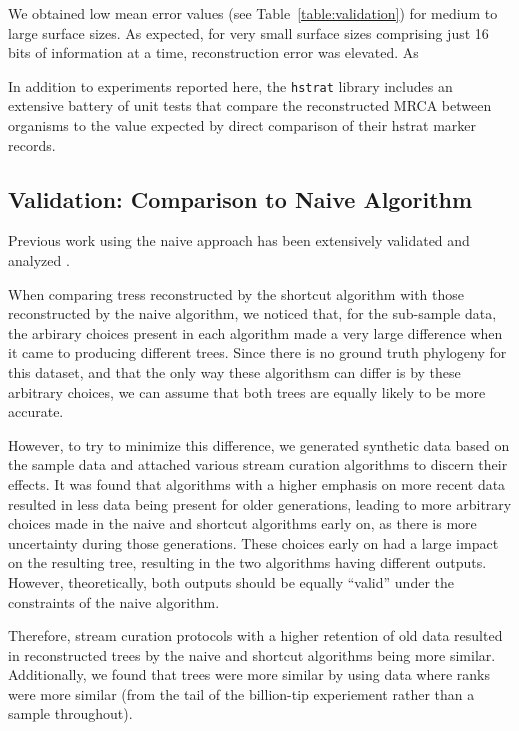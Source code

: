 

We obtained low mean error values (see Table~\ref{table:validation}) for medium to large surface sizes.
As expected, for very small surface sizes comprising just 16 bits of information at a time, reconstruction error was elevated.
As 

In addition to experiments reported here, the \texttt{hstrat} library includes an extensive battery of unit tests that compare the reconstructed MRCA between organisms to the value expected by direct comparison of their hstrat marker records.

\subsection{Validation: Comparison to Naive Algorithm}

Previous work using the naive approach has been extensively validated and analyzed \citep{moreno2025testing}.

When comparing tress reconstructed by the shortcut algorithm with those reconstructed by the naive algorithm, we noticed that, for the sub-sample data, the arbirary choices present in each algorithm made a very large difference when it came to producing different trees.
Since there is no ground truth phylogeny for this dataset, and that the only way these algorithsm can differ is by these arbitrary choices, we can assume that both trees are equally likely to be more accurate.

However, to try to minimize this difference, we generated synthetic data based on the sample data and attached various stream curation algorithms to discern their effects.
It was found that algorithms with a higher emphasis on more recent data resulted in less data being present for older generations, leading to more arbitrary choices made in the naive and shortcut algorithms early on, as there is more uncertainty during those generations.
These choices early on had a large impact on the resulting tree, resulting in the two algorithms having different outputs. However, theoretically, both outputs should be equally ``valid'' under the constraints of the naive algorithm. 

Therefore, stream curation protocols with a higher retention of old data resulted in reconstructed trees by the naive and shortcut algorithms being more similar. Additionally, we found that trees were more similar by using data where ranks were more similar (from the tail of the billion-tip experiement rather than a sample throughout).

